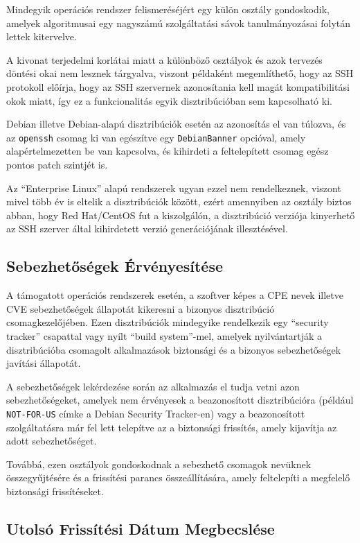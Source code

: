 	Mindegyik operációs rendszer felismeréséjért egy külön osztály gondoskodik, amelyek algoritmusai egy nagyszámú szolgáltatási sávok tanulmányozásai folytán lettek kitervelve.
	
	A kivonat terjedelmi korlátai miatt a különböző osztályok és azok tervezés döntési okai nem lesznek tárgyalva, viszont példaként megemlíthető, hogy az SSH protokoll előírja, hogy az SSH szervernek azonosítania kell magát kompatibilitási okok miatt, így ez a funkcionalitás egyik disztribúcióban sem kapcsolható ki.
	
	Debian illetve Debian-alapú disztribúciók esetén az azonosítás el van túlozva, és az \texttt{openssh} csomag ki van egészítve egy \texttt{DebianBanner} opcióval, amely alapértelmezetten be van kapcsolva, és kihirdeti a feltelepített csomag egész pontos patch szintjét is.
	
	Az ``Enterprise Linux'' alapú rendszerek ugyan ezzel nem rendelkeznek, viszont mivel több év is eltelik a disztribúciók között, ezért amennyiben az osztály biztos abban, hogy Red Hat/CentOS fut a kiszolgálón, a disztribúció verziója kinyerhető az SSH szerver által kihirdetett verzió generációjának illesztésével.

\subsection*{Sebezhetőségek Érvényesítése}

	A támogatott operációs rendszerek esetén, a szoftver képes a CPE nevek illetve CVE sebezhetőségek állapotát kikeresni a bizonyos disztribúció csomagkezelőjében. Ezen disztribúciók mindegyike rendelkezik egy ``security tracker'' csapattal vagy nyílt ``build system''-mel, amelyek nyilvántartják a disztribúcióba csomagolt alkalmazások biztonsági és a bizonyos sebezhetőségek javítási állapotát.
	
	A sebezhetőségek lekérdezése során az alkalmazás el tudja vetni azon sebezhetőségeket, amelyek nem érvényesek a beazonosított disztribúcióra (például \texttt{NOT-FOR-US} címke a Debian Security Tracker-en) vagy a beazonosított szolgáltatásra már fel lett telepítve az a biztonsági frissítés, amely kijavítja az adott sebezhetőséget.
	
	Továbbá, ezen osztályok gondoskodnak a sebezhető csomagok nevüknek összegyűjtésére és a frissítési parancs összeállítására, amely feltelepíti a megfelelő biztonsági frissítéseket.

\subsection*{Utolsó Frissítési Dátum Megbecslése}


